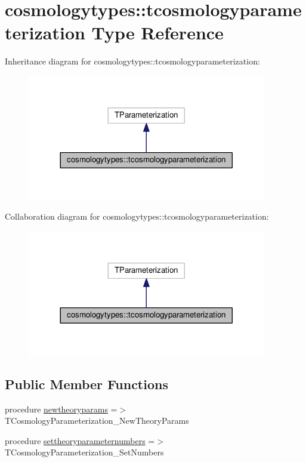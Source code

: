 \hypertarget{structcosmologytypes_1_1tcosmologyparameterization}{}\section{cosmologytypes\+:\+:tcosmologyparameterization Type Reference}
\label{structcosmologytypes_1_1tcosmologyparameterization}


Inheritance diagram for cosmologytypes\+:\+:tcosmologyparameterization\+:
\nopagebreak
\begin{figure}[H]
\begin{center}
\leavevmode
\includegraphics[width=296pt]{structcosmologytypes_1_1tcosmologyparameterization__inherit__graph}
\end{center}
\end{figure}


Collaboration diagram for cosmologytypes\+:\+:tcosmologyparameterization\+:
\nopagebreak
\begin{figure}[H]
\begin{center}
\leavevmode
\includegraphics[width=296pt]{structcosmologytypes_1_1tcosmologyparameterization__coll__graph}
\end{center}
\end{figure}
\subsection*{Public Member Functions}
\begin{DoxyCompactItemize}
\item 
procedure \mbox{\hyperlink{structcosmologytypes_1_1tcosmologyparameterization_a72f2f32078a59a9b02baffb5a3178f6e}{newtheoryparams}} =$>$ T\+Cosmology\+Parameterization\+\_\+\+New\+Theory\+Params
\item 
procedure \mbox{\hyperlink{structcosmologytypes_1_1tcosmologyparameterization_a33d6f6bd2a8720e134a5b6ceeac9a716}{settheoryparameternumbers}} =$>$ T\+Cosmology\+Parameterization\+\_\+\+Set\+Numbers
\end{DoxyCompactItemize}
